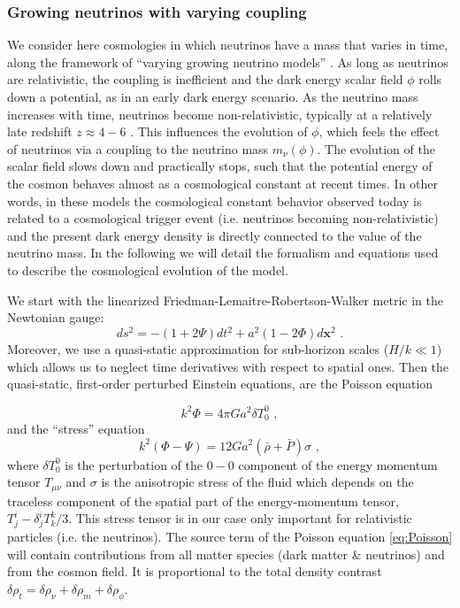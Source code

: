 \subsubsection{Growing neutrinos with varying coupling}

We consider here cosmologies in which neutrinos have a mass that varies
in time, along the framework of ``varying growing neutrino models''
\cite{wetterich_growing_2007}. As long as neutrinos are relativistic,
the coupling is inefficient and the dark energy scalar field $\phi$
rolls down a potential, as in an early dark energy scenario. As the
neutrino mass increases with time, neutrinos become non-relativistic,
typically at a relatively late redshift $z\approx4-6$ \cite{pettorino_neutrino_2010}.
This influences the evolution of $\phi$, which feels the effect of
neutrinos via a coupling to the neutrino mass $m_{\nu}(\phi)$. The
evolution of the scalar field slows down and practically stops, such
that the potential energy of the cosmon behaves almost as a cosmological
constant at recent times. In other words, in these models the cosmological
constant behavior observed today is related to a cosmological trigger
event (i.e. neutrinos becoming non-relativistic) and the present dark
energy density is directly connected to the value of the neutrino
mass. In the following we will detail the formalism and equations
used to describe the cosmological evolution of the model.

We start with the linearized Friedman-Lemaitre-Robertson-Walker metric
in the Newtonian gauge: 
\begin{equation}
ds^{2}=-(1+2\Psi)dt^{2}+a^{2}(1-2\Phi)d\mathbf{x}^{2}\,\,.
\end{equation}
Moreover, we use a quasi-static approximation for sub-horizon scales
($H/k\ll1$) which allows us to neglect time derivatives with respect
to spatial ones. Then the quasi-static, first-order perturbed Einstein
equations, are the Poisson equation \cite{ma_cosmological_1994}

\begin{equation}
k^{2}\Phi=4\pi Ga^{2}\delta T_{0}^{0}\,\,,\label{eq:Poisson}
\end{equation}
and the ``stress'' equation 
\begin{equation}
k^{2}(\Phi-\Psi)=12Ga^{2}(\bar{\rho}+\bar{P})\sigma\,\,,\label{eq:stress-phipsi}
\end{equation}
where $\delta T_{0}^{0}$ is the perturbation of the $0-0$ component
of the energy momentum tensor $T_{\mu\nu}$ and $\sigma$ is the anisotropic
stress of the fluid which depends on the traceless component of the
spatial part of the energy-momentum tensor, $T_{j}^{i}-\delta_{j}^{i}T_{k}^{k}/3$.
This stress tensor is in our case only important for relativistic
particles (i.e. the neutrinos). The source term of the Poisson equation
\ref{eq:Poisson} will contain contributions from all matter
species (dark matter \& neutrinos) and from the cosmon field. It is
proportional to the total density contrast $\delta\rho_{t}=\delta\rho_{\nu}+\delta\rho_{m}+\delta\rho_{\phi}$.

